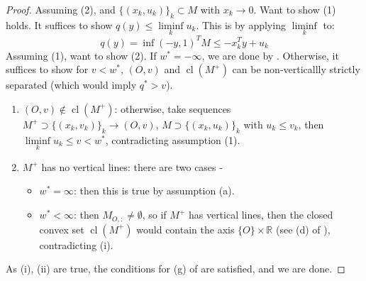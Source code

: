 \begin{proof}
	Assuming (2), and $\{(x_k,u_k)\}_{k}\subset M$ with $x_k\to 0$. Want to show (1) holds. It suffices to show $q(y)\leq \underset{k}{\operatorname{liminf}}u_k$. This is by applying $\underset{k}{\operatorname{liminf}}$ to:
	\[
		q(y)=\inf (-y,1)^TM \leq -x_k^Ty+u_k
	\]
	Assuming (1), want to show (2). If $w^\ast=-\infty$, we are done by . Otherwise, it suffices to show for $v<w^\ast$, $(O,v)$ and $\operatorname{cl}(M^+)$ can be non-verticallly strictly separated (which would imply $q^\ast >v$).
	\begin{enumerate}[label=(\roman*)]
		\item $(O,v)\notin \operatorname{cl}(M^+)$: otherwise, take sequences $M^+\supset\{(x_k,v_k)\}_{k}\to (O,v)$, $M\supset \{(x_k,u_k)\}_{k}$ with $u_k\leq v_k$, then $\underset{k}{\operatorname{liminf}}u_k\leq v<w^\ast$, contradicting assumption (1).
		\item $M^+$ has no vertical lines: there are two cases -
		      \begin{itemize}
			      \item $w^\ast=\infty$: then this is true by assumption (a).
			      \item $w^\ast<\infty$: then $M_{O,:}\neq\emptyset$, so if $M^+$ has vertical lines, then the closed convex set $\operatorname{cl}(M^+)$ would contain the axis $\{O\}\times \mathbb{R}$ (see (d) of ), contradicting (i).
		      \end{itemize}
	\end{enumerate}
	As (i), (ii) are true, the conditions for (g) of  are satisfied, and we are done.
\end{proof}

